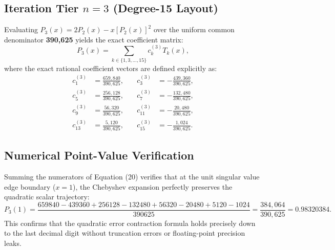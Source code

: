 \documentclass[11pt,a4paper]{article}
\begin{document}
\subsection{Iteration Tier $n=3$ (Degree-15 Layout)}
Evaluating $P_3(x) = 2P_2(x) - x [P_2(x)]^2$ over the uniform common denominator \textbf{390,625} yields the exact coefficient matrix:
\begin{equation}
P_3(x) = \sum_{k \in \{1, 3, \dots, 15\}} c_k^{(3)} T_k(x),
\end{equation}
where the exact rational coefficient vectors are defined explicitly as:
\begin{equation}
\begin{aligned}
c_1^{(3)} &= \frac{659,840}{390,625}, \quad & c_3^{(3)} &= -\frac{439,360}{390,625}, \\
c_5^{(3)} &= \frac{256,128}{390,625}, \quad & c_7^{(3)} &= -\frac{132,480}{390,625}, \\
c_9^{(3)} &= \frac{56,320}{390,625}, \quad & c_{11}^{(3)} &= -\frac{20,480}{390,625}, \\
c_{13}^{(3)} &= \frac{5,120}{390,625}, \quad & c_{15}^{(3)} &= -\frac{1,024}{390,625}.
\end{aligned}
\end{equation}

\subsection{Numerical Point-Value Verification}
Summing the numerators of Equation (20) verifies that at the unit singular value edge boundary ($x=1$), the Chebyshev expansion perfectly preserves the quadratic scalar trajectory:
\begin{equation}
P_3(1) = \frac{659840 - 439360 + 256128 - 132480 + 56320 - 20480 + 5120 - 1024}{390625} = \frac{384,064}{390,625} = \mathbf{0.98320384}.
\end{equation}
This confirms that the quadratic error contraction formula holds precisely down to the last decimal digit without truncation errors or floating-point precision leaks.
\end{document}
